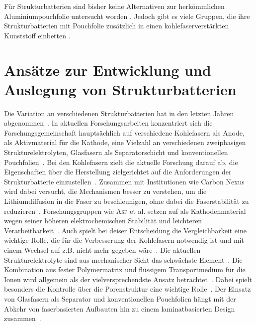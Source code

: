 Für Strukturbatterien sind bisher keine Alternativen zur herkömmlichen Aluminiumpouchfolie untersucht worden \cite{Ye2024}. Jedoch gibt es viele Gruppen, die ihre Strukturbatterien mit Pouchfolie zusätzlich in einen kohlefaserverstärkten Kunststoff einbetten \cite{Pattarakunnan2020,Asp2021}.

\section{Ansätze zur Entwicklung und Auslegung von Strukturbatterien}
Die Variation an verschiedenen Strukturbatterien hat in den letzten Jahren abgenommen~\cite{Asp2024}. In aktuellen Forschungsarbeiten konzentriert sich die Forschungsgemeinschaft hauptsächlich auf verschiedene Kohlefasern als Anode,  als Aktivmaterial für die Kathode, eine Vielzahl an verschiedenen zweiphasigen Strukturelektrolyten, Glasfasern als Separatorschicht und konventionellen Pouchfolien~\cite{Asp2021,Jin2023, Asp2024,Chaudhary2024}. Bei den Kohlefasern zielt die aktuelle Forschung darauf ab, die Eigenschaften über die Herstellung zielgerichtet auf die Anforderungen der Strukturbatterie einzustellen~\cite{Asp2024}. Zusammen mit Institutionen wie Carbon Nexus wird dabei versucht, die Mechanismen besser zu verstehen, um die Lithiumdiffusion in die Faser zu beschleunigen, ohne dabei die Faserstabilität zu reduzieren~\cite{Duan2021,Larsson2023,Johansen2024,Asp2024}. Forschungsgruppen wie \textsc{Asp} et al. setzen auf  als Kathodenmaterial wegen seiner höheren elektrochemischen Stabilität und leichteren Verarbeitbarkeit~\cite{Asp2021, Siraj2023, Ye2024, Chaudhary2024}. Auch spielt bei deiser Entscheidung die Vergleichbarkeit eine wichtige Rolle, die für die Verbesserung der Kohlefasern notwendig ist und mit einem Wechsel auf z.B.  nicht mehr gegeben wäre~\cite{Asp2024}. Die aktuellen Strukturelektrolyte sind aus mechanischer Sicht das schwächste Element~\cite{Lee2019,Jin2023}. Die Kombination aus fester Polymermatrix und flüssigem Transportmedium für die Ionen wird allgemein als der vielversprechendste Ansatz betrachtet~\cite{Lee2019,Asp2021, Greenhalgh2023}. Dabei spielt besonders die Kontrolle über die Porenstruktur eine wichtige Rolle~\cite{Lee2019}. Der Einsatz von Glasfasern als Separator und konventionellen Pouchfolien hängt mit der Abkehr von faserbasierten Aufbauten hin zu einem laminatbasierten Design zusammen~\cite{Zhao2020,Xu2022}.

